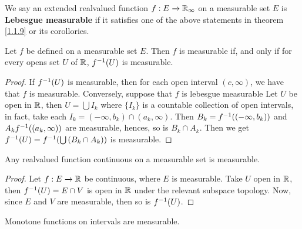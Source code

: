\begin{definition}
    We say an extended realvalued function $f:E \xrightarrow{} \mathbb{R}_\infty$ on a
    measurable set $E$ is \textbf{Lebesgue measurable} if it satisfies one of
    the above statements in theorem \ref{1.1.9} or its corollories.
\end{definition}

\begin{theorem}\label{9.1.2}
    Let $f$ be defined on a measurable set  $E$. Then  $f$ is measurable if, and
    only if for every opens set $U$ of $\mathbb{R}$,  $f^{-1}(U)$ is measurable.
\end{theorem}
\begin{proof}
    If $f^{-1}(U)$ is measurable, then for each open interval $(c, \infty)$, we
    have that $f$ is measurable. Conversely, suppose that  $f$ is lebesgue
    measurable Let  $U$ be open in  $\mathbb{R}$, then  $U=\bigcup{I_k}$ where $\{I_k\}$
    is a countable collection of open intervals, in fact, take each
    $I_k=(-\infty,b_k) \cap (a_k, \infty)$. Then $B_k=f^{-1}((-\infty,b_k))$ and
    $A_kf^{-1}((a_k,\infty))$ are measurable, hences, so is $B_k \cap A_k$.
    Then we get  $f^{-1}(U)=f^{-1}(\bigcup{(B_k \cap A_k)})$ is measurable.
\end{proof}

\begin{lemma}\label{9.1.3}
    Any realvalued function continuous on a measurable set is measurable.
\end{lemma}
\begin{proof}
    Let $f:E \xrightarrow{} \mathbb{R}$ be continuous, where $E$ is measurable. Take
    $U$ open in $\mathbb{R}$, then $f^{-1}(U)=E \cap V$ is open in $\mathbb{R}$ under the
    relevant subspace topology. Now, since $E$ and $V$ are measurable, then so
    is  $f^{-1}(U)$.
\end{proof}

\begin{theorem}\label{9.1.4}
    Monotone functions on intervals are measurable.
\end{theorem}

